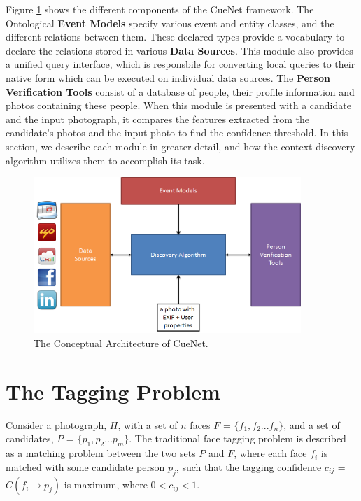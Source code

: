 Figure \ref{fig:cuenet-arch} shows the different components of the CueNet framework. The Ontological \textbf{Event Models} specify various event and entity classes, and the different relations between them. These declared types provide a vocabulary to declare the relations stored in various \textbf{Data Sources}. This module also provides a unified query interface, which is responsbile for converting local queries to their native form which can be executed on individual data sources. The \textbf{Person Verification Tools} consist of a database of people, their profile information and photos containing these people. When this module is presented with a candidate and the input photograph, it compares the features extracted from the candidate's photos and the input photo to find the confidence threshold. In this section, we describe each module in greater detail, and how the context discovery algorithm utilizes them to accomplish its task.

\begin{figure}[t]
\centering
\includegraphics[width=0.9\textwidth]{media/cuenet-high-level-arch.png}
\caption{The Conceptual Architecture of CueNet.}
\label{fig:cuenet-arch}
\end{figure}

\section{The Tagging Problem}
Consider a photograph, $H$, with a set of $n$ faces $F$ = $\{f_1, f_2 ... f_n\}$, and a set of candidates, $P$ = $\{p_1, p_2 ... p_m\}$. The traditional face tagging problem is described as a matching problem between the two sets $P$ and $F$, where each face $f_i$ is matched with some candidate person $p_j$, such that the tagging confidence $c_{ij}$ = $C (f_i \rightarrow p_j)$ is maximum, where $0 < c_{ij} < 1$. 

